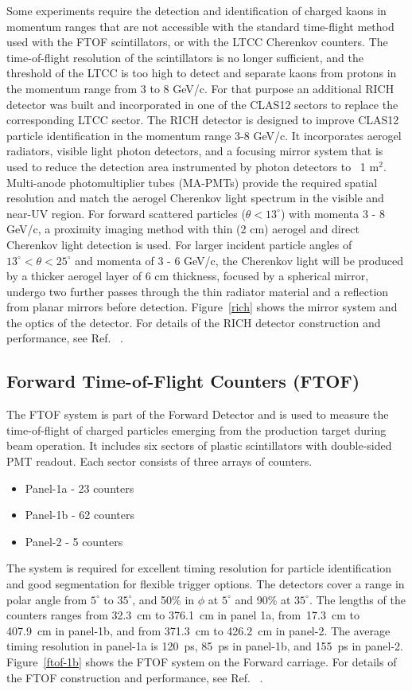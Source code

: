 \documentclass[final,3p,times,twocolumn,authoryear]{elsarticle}
\begin{document}
Some experiments require the detection and identification of charged kaons in momentum ranges that are not 
accessible with the standard time-flight method used with the FTOF scintillators, or with the LTCC Cherenkov counters.
The time-of-flight resolution of the scintillators is no longer sufficient, and the threshold of the LTCC is too high 
to detect and separate kaons from protons in the momentum range from 3 to 8 GeV/c. For that purpose an additional
RICH detector was built and incorporated in one of the CLAS12 sectors to replace the corresponding LTCC sector. 
The RICH detector is designed to improve CLAS12 particle identification in the momentum range 3-8 GeV/c. It incorporates 
aerogel radiators, visible light photon detectors, and a focusing mirror system that is used to reduce the detection 
area instrumented by photon detectors to ~1 m$^2$.  Multi-anode photomultiplier tubes (MA-PMTs) provide the required 
spatial resolution and match the aerogel Cherenkov light spectrum in the visible and near-UV region.
For forward scattered particles ($\theta < 13^\circ$) with momenta 3 - 8 GeV/c, a proximity imaging method with thin (2 cm) 
aerogel and direct Cherenkov light detection is used. For larger incident particle angles of $13^\circ < \theta < 25^\circ$ and 
momenta of 3 - 6 GeV/c, the Cherenkov light will be produced by a thicker aerogel layer of 6 cm thickness, focused by a 
spherical mirror, undergo two further passes through the thin radiator material and a reflection from planar mirrors before 
detection. Figure~\ref{rich} shows the mirror system and the optics of the detector. For details of the RICH detector construction and performance, see Ref. ~\cite{RICH}.

\subsection{\rm Forward Time-of-Flight Counters (FTOF)}
\label{ftof}

The FTOF system is part of the Forward Detector and is used to measure the time-of-flight of charged particles 
emerging from the production target during beam operation. It includes six sectors of plastic scintillators with 
double-sided PMT readout. Each sector consists of three arrays of counters. 
\begin{itemize}
\item Panel-1a - 23 counters 
\item Panel-1b - 62 counters
\item Panel-2 - 5 counters 
\end{itemize}
The system is required for excellent timing resolution for particle identification and good segmentation for 
flexible trigger options. The detectors cover a  range in polar angle from $5^\circ$ to $35^\circ$, and 50\% in $\phi$ at 
$5^\circ$ and 90\% at $35^\circ$. The lengths of the counters ranges from 32.3~cm to 376.1~cm in panel 1a, from~17.3~cm 
to 407.9~cm in panel-1b, and from 371.3~cm to 426.2~cm in panel-2.  The average timing resolution in panel-1a is 120~ps, 
85~ps in panel-1b, and 155~ps in panel-2.  
Figure~\ref{ftof-1b} shows the FTOF system on the Forward carriage.
For details of the FTOF construction and performance, see Ref. ~\cite{FTOF}. 
\end{document}
